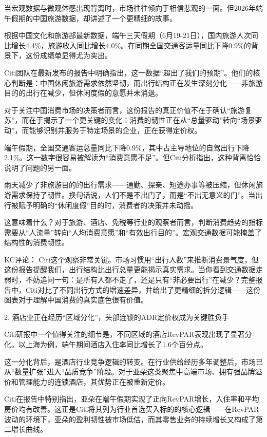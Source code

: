 \documentclass[11pt]{ctexart}
\begin{document}
当宏观数据与微观体感出现背离时，市场往往倾向于相信悲观的一面。但2026年端午假期的中国旅游数据，却讲述了一个更精细的故事。

根据中国文化和旅游部最新数据，端午三天假期（6月19-21日），国内旅游人次同比增长4.4\%，旅游收入同比增长4.0\%。在同期全国交通客运量同比下降0.9\%的背景下，这份成绩单显得尤为突出。

Citi团队在最新发布的报告中明确指出，这一数据“超出了我们的预期”。他们的核心判断是：中国休闲旅游需求依然坚韧，而出行结构正在发生深刻分化——非旅游目的的出行在减少，但休闲度假的意愿并未消退。

对于关注中国消费市场的决策者而言，这份报告的真正价值不在于确认“旅游复苏”，而在于揭示了一个更关键的变化：消费的韧性正在从“总量驱动”转向“场景驱动”，而能够识别并服务于特定场景的企业，正在获得定价权。

端午假期，全国交通客运总量同比下降0.9\%，其中占主导地位的自驾出行下降2.1\%。这一数字很容易被解读为“消费意愿不足”。但Citi分析指出，这种背离恰恰说明了问题的另一面。

雨天减少了非旅游目的的出行需求——通勤、探亲、短途办事等被压缩，但休闲旅游需求保持了韧性。换句话说，人们不是不出门了，而是“不出无意义的门”。当出行被赋予明确的“休闲度假”目的时，消费者的决策并未动摇。

这意味着什么？对于旅游、酒店、免税等行业的观察者而言，判断消费趋势的指标需要从“人流量”转向“人均消费意愿”和“有效出行目的”。宏观交通数据可能掩盖了结构性的消费韧性。

KC评论： Citi这个观察非常关键。市场习惯用“出行人数”来推断消费景气度，但这份报告提醒我们，出行结构比出行总量更能揭示真实需求。当你看到交通数据走弱时，不妨追问一句：是所有人都不走了，还是只有“非必要出行”在减少？完整报告中，Citi对比了不同出行方式的增速差异，并给出了更精细的拆分逻辑——这份图表对于理解中国消费的真实底色很有价值。

2. 酒店业正在经历“区域分化”，头部连锁的ADR定价权成为关键胜负手

Citi研报中一个值得关注的细节是，不同区域的酒店RevPAR表现出现了显著分化。以上海为例，端午期间酒店入住率同比增长了1.6个百分点。

这一分化背后，是酒店行业竞争逻辑的转变。在行业供给经历多年调整后，市场已从“数量扩张”进入“品质竞争”阶段。对于亚朵这类聚焦中高端市场、拥有强品牌溢价和管理能力的连锁酒店，其优势正在被重新定价。

Citi在报告中特别指出，亚朵在端午假期实现了正向RevPAR增长，入住率和平均房价均有改善。这正是Citi将其列为行业首选买入标的的核心逻辑——在RevPAR波动的环境下，亚朵的盈利韧性被市场低估，而其零售业务的持续增长又构成了第二增长曲线。
\end{document}
